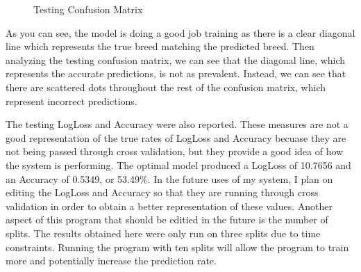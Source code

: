 \documentclass[12pt]{article}
\begin{document}
\begin{figure}[H]
\begin{minipage}{0.45\textwidth}
        \caption{Testing Confusion Matrix}
    \end{minipage}
\end{figure}
As you can see, the model is doing a good job training as there is a clear diagonal line which represents the true breed matching the predicted breed.  Then analyzing the testing confusion matrix, we can see that the diagonal line, which represents the accurate predictions, is not as prevalent.  Instead, we can see that there are scattered dots throughout the rest of the confusion matrix, which represent incorrect predictions.

The testing LogLoss and Accuracy were also reported.  These measures are not a good representation of the true rates of LogLoss and Accuracy becuase they are not being passed through cross validation, but they provide a good idea of how the system is performing.  The optimal model produced a LogLoss of 10.7656 and an Accuracy of 0.5349, or 53.49\%.  In the future uses of my system, I plan on editing the LogLoss and Accuracy so that they are running through cross validation in order to obtain a better representation of these values.  Another aspect of this program that should be editied in the future is the number of splits.  The results obtained here were only run on three splits due to time constraints.  Running the program with ten splits will allow the program to train more and potentially increase the prediction rate.
\end{document}
